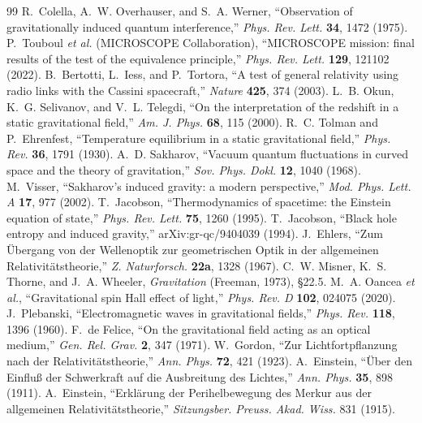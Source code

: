 \documentclass[11pt]{article}
\theoremstyle{plain}
\theoremstyle{remark}
\begin{document}
\begin{thebibliography}{99}
R.~Colella, A.~W. Overhauser, and S.~A. Werner, ``Observation of gravitationally induced quantum interference,'' \emph{Phys. Rev. Lett.} \textbf{34}, 1472 (1975).
P.~Touboul \emph{et al.} (MICROSCOPE Collaboration), ``MICROSCOPE mission: final results of the test of the equivalence principle,'' \emph{Phys. Rev. Lett.} \textbf{129}, 121102 (2022).
B.~Bertotti, L.~Iess, and P.~Tortora, ``A test of general relativity using radio links with the Cassini spacecraft,'' \emph{Nature} \textbf{425}, 374 (2003).
L.~B. Okun, K.~G. Selivanov, and V.~L. Telegdi, ``On the interpretation of the redshift in a static gravitational field,'' \emph{Am. J. Phys.} \textbf{68}, 115 (2000).
R.~C. Tolman and P.~Ehrenfest, ``Temperature equilibrium in a static gravitational field,'' \emph{Phys. Rev.} \textbf{36}, 1791 (1930).
A.~D. Sakharov, ``Vacuum quantum fluctuations in curved space and the theory of gravitation,'' \emph{Sov. Phys. Dokl.} \textbf{12}, 1040 (1968).
M.~Visser, ``Sakharov's induced gravity: a modern perspective,'' \emph{Mod. Phys. Lett. A} \textbf{17}, 977 (2002).
T.~Jacobson, ``Thermodynamics of spacetime: the Einstein equation of state,'' \emph{Phys. Rev. Lett.} \textbf{75}, 1260 (1995).
T.~Jacobson, ``Black hole entropy and induced gravity,'' arXiv:gr-qc/9404039 (1994).
J.~Ehlers, ``Zum \"Ubergang von der Wellenoptik zur geometrischen Optik in der allgemeinen Relativit\"atstheorie,'' \emph{Z. Naturforsch.} \textbf{22a}, 1328 (1967).
C.~W. Misner, K.~S. Thorne, and J.~A. Wheeler, \emph{Gravitation} (Freeman, 1973), \S22.5.
M.~A. Oancea \emph{et al.}, ``Gravitational spin Hall effect of light,'' \emph{Phys. Rev. D} \textbf{102}, 024075 (2020).
J.~Plebanski, ``Electromagnetic waves in gravitational fields,'' \emph{Phys. Rev.} \textbf{118}, 1396 (1960).
F.~de Felice, ``On the gravitational field acting as an optical medium,'' \emph{Gen. Rel. Grav.} \textbf{2}, 347 (1971).
W.~Gordon, ``Zur Lichtfortpflanzung nach der Relativit\"atstheorie,'' \emph{Ann. Phys.} \textbf{72}, 421 (1923).
A.~Einstein, ``\"Uber den Einflu{\ss} der Schwerkraft auf die Ausbreitung des Lichtes,'' \emph{Ann. Phys.} \textbf{35}, 898 (1911).
A.~Einstein, ``Erkl\"arung der Perihelbewegung des Merkur aus der allgemeinen Relativit\"atstheorie,'' \emph{Sitzungsber. Preuss. Akad. Wiss.} 831 (1915).

\end{thebibliography}
\end{document}
